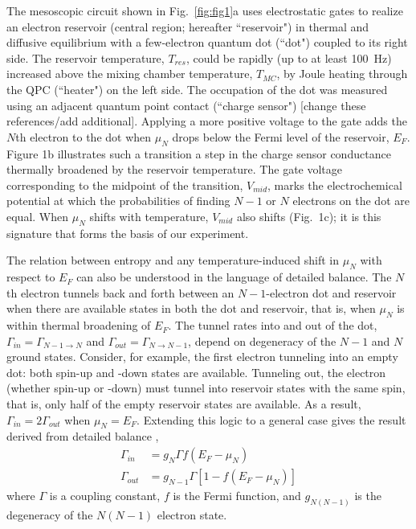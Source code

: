 \documentclass[twocolumn,showpacs,amsmath,amssymb,prl,aps,superscriptaddress]{revtex4-1}
\begin{document}
The mesoscopic circuit shown in Fig.~\ref{fig:fig1}a uses electrostatic gates to realize an electron reservoir (central region; hereafter ``reservoir") in thermal and diffusive equilibrium with a few-electron quantum dot (``dot") coupled to its right side.  The reservoir temperature, $T_{res}$, could be rapidly (up to at least \SI{100}{\hertz}) increased above the mixing chamber temperature, $T_{MC}$, by Joule heating through the QPC (``heater") on the left side.  The occupation of the dot was measured using an adjacent quantum point contact (``charge sensor")\cite{Staring2007, Thierschmann2015} [change these references/add additional].  Applying a more positive voltage to the gate adds the $N$th electron to the dot when $\mu_{N}$ drops below the Fermi level of the reservoir, $E_F$. Figure 1b illustrates such a transition \textemdash a step in the charge sensor conductance \textemdash thermally broadened by the reservoir temperature.  The gate voltage corresponding to the midpoint of the transition, $V_{mid}$, marks the electrochemical potential at which the probabilities of finding $N-1$ or $N$ electrons on the dot are equal.  When $\mu_N$ shifts with temperature, $V_{mid}$ also shifts (Fig.~1c); it is this signature that forms the basis of our experiment.%

The relation between entropy and any temperature-induced shift in $\mu_{N}$ with respect to $E_F$ can also be understood in the language of detailed balance.  The $N$th electron tunnels back and forth between an $N-1$-electron dot and reservoir when there are available states in both the dot and reservoir, that is, when $\mu_{N}$ is within thermal broadening of $E_F$.  The tunnel rates into and out of the dot, $\Gamma_{in}=\Gamma_{N-1\rightarrow N}$ and $\Gamma_{out}=\Gamma_{N\rightarrow N-1}$, depend on degeneracy of the $N-1$ and $N$ ground states.  %
Consider, for example, the first electron tunneling into an empty dot: both spin-up and -down states are available.  Tunneling out, the electron (whether spin-up or -down) must tunnel into reservoir states with the same spin, that is, only half of the empty reservoir states are available.  As a result, $\Gamma_{in} = 2\Gamma_{out}$ when $\mu_{N}=E_F$.  Extending this logic to a general case gives the result derived from detailed balance \cite{Gustavsson2009, Beenakker1991}, 
%
\begin{align}
	\Gamma_{in} &=  g_{N} \Gamma f(E_F - \mu_{N}) \nonumber \\
	\Gamma_{out} &= g_{N-1} \Gamma [1 - f(E_F - \mu_{N})] \label{eqn:rates}
\end{align}
%
where $\Gamma$ is a coupling constant, $f$ is the Fermi function, and $g_{N(N-1)}$ is the degeneracy of the $N(N-1)$ electron state.
\end{document}
